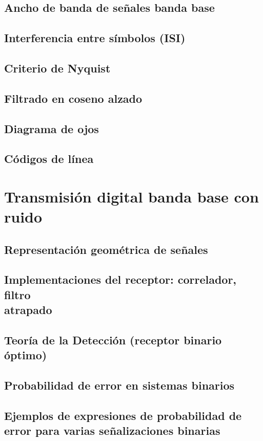 \documentclass[a4paper]{book}
\begin{document}
\section{Ancho de banda de señales banda base}
\section{Interferencia entre símbolos (ISI)}
\section{Criterio de Nyquist}
\section{Filtrado en coseno alzado}
\section{Diagrama de ojos}
\section{Códigos de línea}

\chapter{Transmisión digital banda base con ruido}
\section{Representación geométrica de señales}
\section{\texorpdfstring{Implementaciones del receptor: correlador, filtro\\ atrapado}{Implementaciones del receptor: correlador, filtro atrapado}}
\section{Teoría de la Detección (receptor binario óptimo)}
\section{Probabilidad de error en sistemas binarios}
\section[\texorpdfstring{Ejemplos de expresiones de probabilidad de error para varias\\ señalizaciones binarias}{Ejemplos de expresiones de probabilidad de error para varias señalizaciones binarias}]{Ejemplos de expresiones de probabilidad de error para varias señalizaciones binarias}
\end{document}
